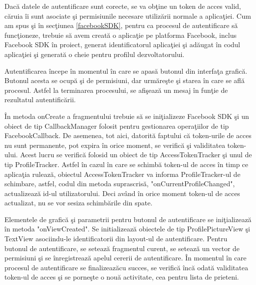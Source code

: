 	Dac\u{a} datele de autentificare sunt corecte, se va ob\c{t}ine un token de acces valid, c\u{a}ruia \^{i}i sunt asociate \c{s}i permisiunile necesare utiliz\u{a}rii normale a aplica\c{t}iei. Cum am spus \c{s}i \^{i}n sec\c{t}iunea \ref{facebookSDK}, pentru ca procesul de autentificare s\u{a} func\c{t}ioneze, trebuie s\u{a} avem creat\u{a} o aplica\c{t}ie pe platforma Facebook, inclus Facebook SDK \^{i}n proiect, generat identificatorul aplica\c{t}iei \c{s}i ad\u{a}ugat \^{i}n codul aplica\c{t}iei \c{s}i generat\u{a} o cheie pentru profilul dezvoltatorului.
	
	Autentificarea \^{i}ncepe \^{i}n momentul \^{i}n care se apas\u{a} butonul din interfa\c{t}a grafic\u{a}. Butonul acesta se ocup\u{a} \c{s}i de permisiuni, dar urm\u{a}re\c{s}te \c{s}i starea \^{i}n care se afl\u{a} procesul. Astfel la terminarea procesului, se afi\c{s}eaz\u{a} un mesaj \^{i}n fun\c{t}ie de rezultatul autentific\u{a}rii.
	
	\^{I}n metoda onCreate a fragmentului trebuie s\u{a} se ini\c{t}ializeze Facebook SDK \c{s}i un obiect de tip CallbackManager folosit pentru gestionarea opera\c{t}iilor de tip FacebookCallback. De asemenea, tot aici, datorit\u{a} faptului c\u{a} token-urile de acces nu sunt permanente, pot expira \^{i}n orice moment, se verific\u{a} \c{s}i validitatea token-ului. Acest lucru se verific\u{a} folosid un obiect de tip AccessTokenTracker \c{s}i unul de tip ProfileTracker. Astfel \^{i}n cazul \^{i}n care se schimb\u{a} token-ul de acces \^{i}n timp ce aplica\c{t}ia ruleaz\u{a}, obiectul AccessTokenTracker va informa ProfileTracker-ul de schimbare, astfel, codul din metoda suprascris\u{a}, "onCurrentProfileChanged", actualizeaz\u{a} id-ul utilizatorului. Deci av\^{a}nd \^{i}n orice moment token-ul de acces actualizat, nu se vor sesiza schimb\u{a}rile din spate.
	
	Elementele de grafic\u{a} \c{s}i parametrii pentru butonul de autentificare se ini\c{t}ializeaz\u{a} \^{i}n metoda "onViewCreated". Se initializeaz\u{a} obiectele de tip ProfilePictureView \c{s}i TextView asociindu-le identificatorii din layout-ul de autentificare. Pentru butonul de autentificare, se seteaz\u{a} fragmentul curent, se seteaz\u{a} un vector de permisiuni \c{s}i se \^{i}nregistreaz\u{a} apelul cererii de autentificare. \^{I}n momentul \^{i}n care procesul de autentificare se finalizeaz\u{a}cu succes, se verific\u{a} \^{i}nc\u{a} odat\u{a} validitatea token-ul de acces \c{s}i se porne\c{s}te o nou\u{a} activitate, cea pentru lista de prieteni.

